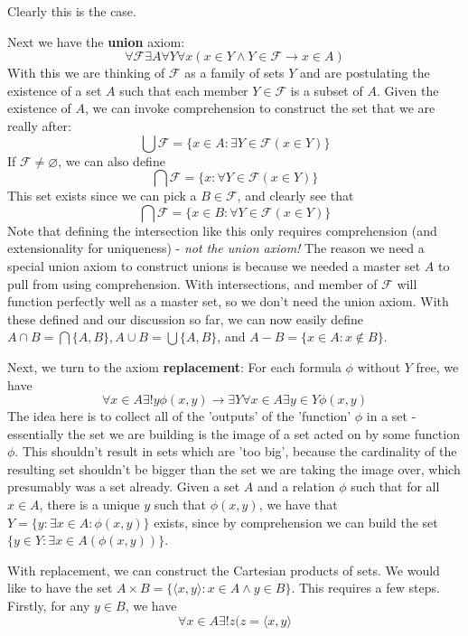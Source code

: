 \documentclass{article}
\theoremstyle{definition}
\theoremstyle{plain}
\theoremstyle{theorem}
\begin{document}
Clearly this is the case. 
\par Next we have the \textbf{union} axiom: \[\forall \mathcal{F} \exists A \forall Y \forall x (x \in Y \wedge Y \in \mathcal{F} \rightarrow x \in A)\]
With this we are thinking of $\mathcal{F}$ as a family of sets $Y$ 	and are postulating the existence of a set $A$ such that each member $Y \in \mathcal{F}$ is a subset of $A$. Given the existence of $A$, we can invoke comprehension to construct the set that we are really after:
\[ \bigcup \mathcal{F} = \{x \in A: \exists Y \in \mathcal{F}(x \in Y)\} \]
If $\mathcal{F} \neq \varnothing$, we can also define
\[ \bigcap \mathcal{F} = \{x: \forall Y \in \mathcal{F} (x \in Y)\} \]
This set exists since we can pick a $B \in \mathcal{F}$, and clearly see that 
\[  \bigcap \mathcal{F} = \{x \in B: \forall Y \in \mathcal{F} (x \in Y) \} \]
Note that defining the intersection like this only requires comprehension (and extensionality for uniqueness) - \textit{not the union axiom!} The reason we need a special union axiom to construct unions is because we needed a master set $A$ to pull from using comprehension. With intersections, and member of $\mathcal{F}$ will function perfectly well as a master set, so we don't need the union axiom. With these defined and our discussion so far, we can now easily define $A \cap B = \bigcap \{A,B\}, A \cup B = \bigcup \{A,B\}$, and $A - B = \{x \in A: x \notin B\}$. 
\par Next, we turn to the axiom \textbf{replacement}: For each formula $\phi$ without $Y$ free, we have
	\[ \forall x \in A \exists!y \phi(x,y) \rightarrow \exists Y \forall x \in A \exists y \in Y \phi(x,y) \]
The idea here is to collect all of the 'outputs' of the 'function' $\phi$ in a set - essentially the set we are building is the image of a set acted on by some function $\phi$. This shouldn't result in sets which are 'too big', because the cardinality of the resulting set shouldn't be bigger than the set we are taking the image over, which presumably was a set already. Given a set $A$ and a relation $\phi$ such that for all $x \in A$, there is a unique $y$ such that $\phi(x,y)$, we have that $Y = \{y: \exists x \in A: \phi(x,y)\}$ exists, since by comprehension we can build the set $\{y \in Y: \exists x \in A (\phi(x,y))\}$. \par 
With replacement, we can construct the Cartesian products of sets. We would like to have the set $A \times B = \{\langle x,y \rangle: x \in A \wedge y \in B\}$. This requires a few steps. Firstly, for any $y \in B$, we have 
\[ \forall x \in A \exists!z (z = \langle x,y \rangle \]
\end{document}
